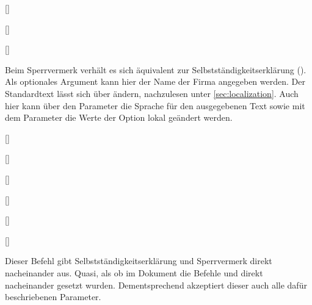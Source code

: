 \documentclass[%
  english,ngerman,%
  headings=optiontoheadandtoc,captions=tableheading,numbers=noenddot,%
  chapterpage,cdfoot,%
]{tudscrman}
\begin{document}
\begin{Declaration}{}
\begin{Declaration}{[]}
\begin{Declaration}{[]}
\begin{Declaration}{[\PSet]}
\printdeclarationlist%
%

Beim Sperrvermerk verhält es sich äquivalent zur Selbstständigkeitserklärung 
(). Als optionales Argument kann hier der Name der Firma 
angegeben werden. Der Standardtext lässt sich über  
ändern, nachzulesen unter \autoref{sec:localization}. Auch hier kann über den 
Parameter  die Sprache für den ausgegebenen 
Text sowie mit dem Parameter  die Werte der 
Option  lokal geändert werden.
\end{Declaration}
\end{Declaration}
\end{Declaration}
\end{Declaration}

\begin{Declaration}{\LParameter}
\begin{Declaration}{[]}
\begin{Declaration}{[]}
\begin{Declaration}{[]}
\begin{Declaration}{[]}
\begin{Declaration}{[]}
\begin{Declaration}{[\PSet]}
\printdeclarationlist%
%

Dieser Befehl gibt Selbstständigkeitserklärung und Sperrvermerk direkt 
nacheinander aus. Quasi, als ob im Dokument die Befehle  und 
 direkt nacheinander gesetzt wurden. Dementsprechend 
akzeptiert dieser auch alle dafür beschriebenen Parameter.
\end{Declaration}
\end{Declaration}
\end{Declaration}
\end{Declaration}
\end{Declaration}
\end{Declaration}
\end{Declaration}
\end{document}
